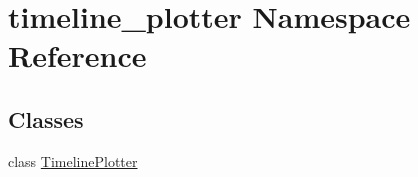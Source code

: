 \hypertarget{namespacetimeline__plotter}{}\section{timeline\+\_\+plotter Namespace Reference}
\label{namespacetimeline__plotter}
\subsection*{Classes}
\begin{DoxyCompactItemize}
\item 
class \hyperlink{classtimeline__plotter_1_1TimelinePlotter}{Timeline\+Plotter}
\end{DoxyCompactItemize}
